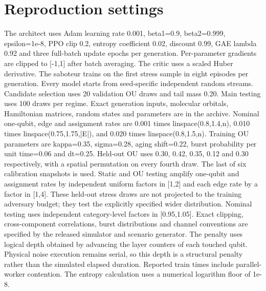 \documentclass[11pt]{article}
\begin{document}
\appendix
\section{Reproduction settings}
The architect uses Adam learning rate 0.001, beta1=0.9, beta2=0.999, epsilon=1e-8, PPO clip 0.2, entropy coefficient 0.02, discount 0.99, GAE lambda 0.92 and three full-batch update epochs per generation. Per-parameter gradients are clipped to [-1,1] after batch averaging. The critic uses a scaled Huber derivative. The saboteur trains on the first stress sample in eight episodes per generation. Every model starts from seed-specific independent random streams. Candidate selection uses 20 validation OU draws and tail mass 0.20. Main testing uses 100 draws per regime. Exact generation inputs, molecular orbitals, Hamiltonian matrices, random states and parameters are in the archive.
Nominal one-qubit, edge and assignment rates are 0.001 times linspace(0.8,1.4,n), 0.010 times linspace(0.75,1.75,|E|), and 0.020 times linspace(0.8,1.5,n). Training OU parameters are kappa=0.35, sigma=0.28, aging shift=0.22, burst probability per unit time=0.06 and dt=0.25. Held-out OU uses 0.30, 0.42, 0.35, 0.12 and 0.30 respectively, with a spatial permutation on every fourth draw. The last of six calibration snapshots is used. Static and OU testing amplify one-qubit and assignment rates by independent uniform factors in [1,2] and each edge rate by a factor in [1,4]. These held-out stress draws are not projected to the training adversary budget; they test the explicitly specified wider distribution. Nominal testing uses independent category-level factors in [0.95,1.05]. Exact clipping, cross-component correlations, burst distributions and channel conventions are specified by the released simulator and scenario generator. The penalty uses logical depth obtained by advancing the layer counters of each touched qubit. Physical noise execution remains serial, so this depth is a structural penalty rather than the simulated elapsed duration. Reported train times include parallel-worker contention. The entropy calculation uses a numerical logarithm floor of 1e-8.
\end{document}
